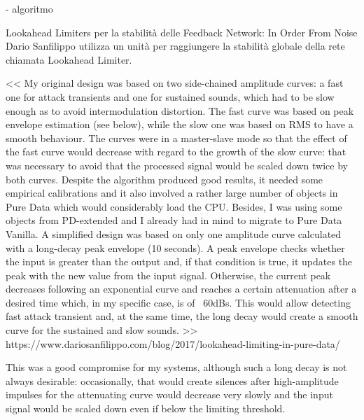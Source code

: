 - algoritmo


Lookahead Limiters per la stabilità delle Feedback Network:
In Order From Noise Dario Sanfilippo utilizza un unità per raggiungere la stabilità
globale della rete chiamata Lookahead Limiter.

<< My original design was based on two side-chained amplitude curves: 
a fast one for attack transients and one for sustained sounds, which had 
to be slow enough as to avoid intermodulation distortion. The fast curve 
was based on peak envelope estimation (see below), while the slow one was based on 
RMS to have a smooth behaviour. The curves were in a master-slave mode so that 
the effect of the fast curve would decrease with regard to the growth of the slow curve: 
that was necessary to avoid that the processed signal would be scaled down twice by both curves. 
Despite the algorithm produced good results, it needed some empirical calibrations 
and it also involved a rather large number of objects in Pure Data which would considerably load the CPU. 
Besides, I was using some objects from PD-extended and I already had in mind to migrate to Pure Data Vanilla.
A simplified design was based on only one amplitude curve calculated with a long-decay peak envelope (10 seconds). 
A peak envelope checks whether the input is greater than the output and, if that condition is true, 
it updates the peak with the new value from the input signal. 
Otherwise, the current peak decreases following an exponential curve and reaches a certain 
attenuation after a desired time which, in my specific case, is of ~60dBs. 
This would allow detecting fast attack transient and, at the same time, 
the long decay would create a smooth curve for the sustained and slow sounds. >>
https://www.dariosanfilippo.com/blog/2017/lookahead-limiting-in-pure-data/

This was a good compromise for my systems, although such a long decay is not always desirable: occasionally, 
that would create silences after high-amplitude impulses for the attenuating curve 
would decrease very slowly and the input signal would be scaled down even if below the limiting threshold.